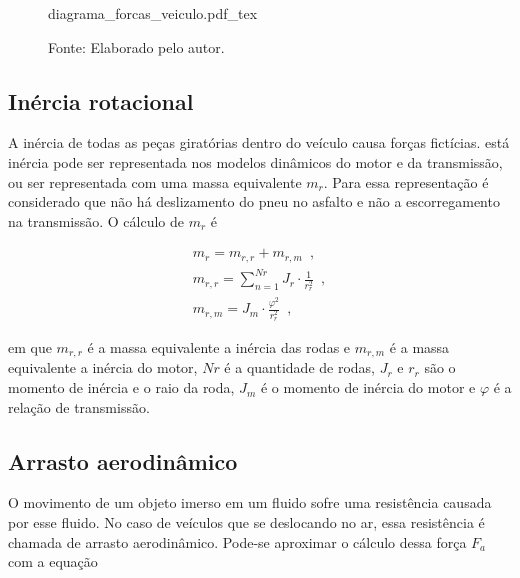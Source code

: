 \begin{figure}[h]
	\centering
	\caption{Diagrama de forças de um veículo em movimento}
	\label{fig:diag_forcas_veiculo}
	\begin{normalsize}
		{diagrama_forcas_veiculo.pdf_tex}
	\end{normalsize}
	\caption*{\footnotesize Fonte: Elaborado pelo autor.}
\end{figure}

\subsection{Inércia rotacional}

A inércia de todas as peças giratórias dentro do veículo causa forças fictícias. 
está inércia pode ser representada nos modelos dinâmicos do motor e da transmissão, ou ser representada com uma massa equivalente $m_r$.
Para essa representação é considerado que não há deslizamento do pneu no asfalto e não a escorregamento na transmissão. O cálculo de $m_r$ é 

\begin{subequations}
	\label{eq:mr}
	\begin{align}
		m_r = m_{r,r} + m_{r,m} \enspace, \label{eq:mr1} \\
		m_{r,r} = \sum_{n=1}^{Nr} J_r \cdot \frac{1}{r_r^2} \enspace, \label{eq:mr2} \\
		m_{r,m} = J_m \cdot \frac{\varphi^2}{r_r^2} \enspace, \label{eq:mr3}
	\end{align}
\end{subequations}

em que $m_{r,r}$ é a massa equivalente a inércia das rodas e $m_{r,m}$ é a massa equivalente a inércia do motor, $Nr$ é a quantidade de rodas, 
$J_r$ e $r_r$ são o momento de inércia e o raio da roda, $J_m$ é o momento de inércia do motor e 
$\varphi$ é a relação de transmissão. \hbox{\cite[Seç.~2.1.1]{book:guzzella2012vehicle}}

\subsection{Arrasto aerodinâmico}
\label{subsec:arrasto_aerodinamico}

O movimento de um objeto imerso em um fluido sofre uma resistência causada por esse fluido. No
caso de veículos que se deslocando no ar, essa
resistência é chamada de arrasto aerodinâmico.
Pode-se aproximar o cálculo dessa força $F_{a}$ com a equação

